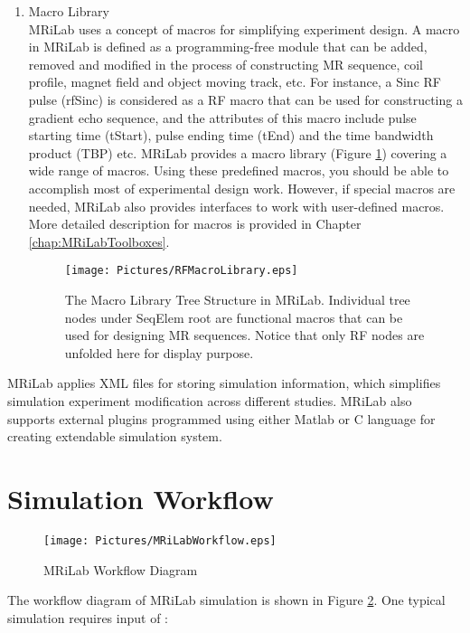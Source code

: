 \documentclass{book}%
\begin{document}
\begin{enumerate}
\item Macro Library \\
MRiLab uses a concept of macros for simplifying experiment design. A macro in MRiLab is defined as a programming-free module that can be added, removed and modified in the process of constructing MR sequence, coil profile, magnet field and object moving track, etc. For instance, a Sinc RF pulse (rfSinc) is considered as a RF macro that can be used for constructing a gradient echo sequence, and the attributes of this macro include pulse starting time (tStart), pulse ending time (tEnd) and the time bandwidth product (TBP) etc. MRiLab provides a macro library (Figure \ref{fig:RFMacroLibrary}) covering a wide range of macros. Using these predefined macros, you should be able to accomplish most of experimental design work. However, if special macros are needed, MRiLab also provides interfaces to work with user-defined macros. More detailed description for macros is provided in Chapter \ref{chap:MRiLabToolboxes}.

\begin{figure}[htbp]
	\centering
		\texttt{[image: Pictures/RFMacroLibrary.eps]}
	\caption{The Macro Library Tree Structure in MRiLab. Individual tree nodes under SeqElem root are functional macros that can be used for designing MR sequences. Notice that only RF nodes are unfolded here for display purpose.}
	\label{fig:RFMacroLibrary}
\end{figure}

\end{enumerate}
    
MRiLab applies XML files for storing simulation information, which simplifies simulation experiment modification across different studies. MRiLab also supports external plugins programmed using either Matlab or C language for creating extendable simulation system. 

\section{Simulation Workflow}

\begin{figure}[htbp]
	\centering
		\texttt{[image: Pictures/MRiLabWorkflow.eps]}
	\caption{MRiLab Workflow Diagram}
	\label{fig:MRiLabWorkflow}
\end{figure}

The workflow diagram of MRiLab simulation is shown in Figure \ref{fig:MRiLabWorkflow}. One typical simulation requires input of :
\end{document}
